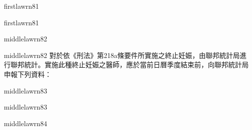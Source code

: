 \documentclass[12pt]{article}
\begin{document}
\begin{sourceboxpara}[title={原文理由 A.II.3.c 舊法第4條}]
\begin{lawboxpart}{first}{lawrn81}
\end{lawboxpart}
\end{sourceboxpara}
\begin{transboxpara}
\begin{lawboxpart}{first}{lawrn81}
\end{lawboxpart}
\end{transboxpara}
\begin{sourceboxpara}
\begin{lawboxpart}{middle}{lawrn82}
\end{lawboxpart}
\end{sourceboxpara}
\begin{transboxpara}
\begin{lawboxpart}{middle}{lawrn82}
對於依《刑法》第218a條要件所實施之終止妊娠，由聯邦統計局進行聯邦統計。實施此種終止妊娠之醫師，應於當前日曆季度結束前，向聯邦統計局申報下列資料：
\end{lawboxpart}
\end{transboxpara}
\begin{sourceboxpara}
\begin{lawboxpart}{middle}{lawrn83}
\end{lawboxpart}
\end{sourceboxpara}
\begin{transboxpara}
\begin{lawboxpart}{middle}{lawrn83}
\end{lawboxpart}
\end{transboxpara}
\begin{sourceboxpara}
\begin{lawboxpart}{middle}{lawrn84}
\end{lawboxpart}
\end{sourceboxpara}
\end{document}
